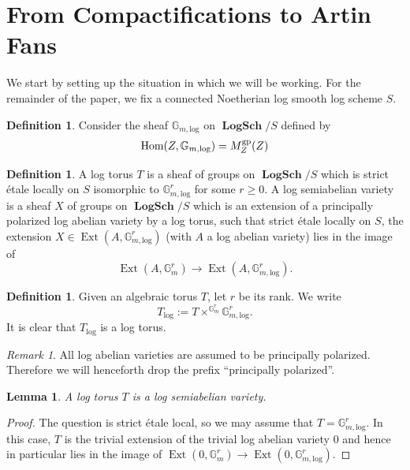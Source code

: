 \documentclass[11pt]{amsart}
\newtheorem{lemma}[theorem]{Lemma}
\theoremstyle{definition}
\newtheorem{definition}[theorem]{Definition}
\theoremstyle{remark}
\newtheorem{remark}[theorem]{Remark}
\DeclareMathOperator{\Ext}{Ext}
\def\log{\mathrm{log}}
\def\gp{\mathrm{gp}}
\DeclareMathOperator{\LogSch}{\mathbf{LogSch}}
\DeclareMathOperator{\Hom}{\textup{Hom}}
\begin{document}
\section{From Compactifications to Artin Fans}
\label{sec:first_results}

We start by setting up the situation in which we will be working. For the remainder of the paper, we fix a connected Noetherian log smooth log scheme $S$.

\begin{definition}
    Consider the sheaf $\mathbb{G}_{m,\log}$ on $\LogSch/S$ defined by
    \begin{align*}
		\Hom(Z,\mathbb{G}_{m,\log}) = M_Z^{\gp}(Z)
    \end{align*}
\end{definition}

\begin{definition}
	A log torus $T$ is a sheaf of groups on $\LogSch/S$ which is strict étale locally on $S$ isomorphic to
	$\mathbb{G}_{m,\log}^{r}$ for some $r\ge 0$.
	A log semiabelian variety is a sheaf $X$ of groups on $\LogSch/S$ which is an extension of a principally polarized log abelian
	variety by a log torus, such that strict étale locally on $S$, the extension $X\in \Ext(A,\mathbb{G}_{m,\log}^{r})$
	(with $A$ a log abelian variety) lies in the image of
	$$\Ext(A,\mathbb{G}_m^{r})\to \Ext(A,\mathbb{G}_{m,\log}^{r}).$$
\end{definition}

\begin{definition}
	Given an algebraic torus $T$, let $r$ be its rank. We write
	$$T_{\log}:=T\times^{\mathbb{G}_m^r}\mathbb{G}_{m,\log}^r.$$
	It is clear that $T_{\log}$ is a log torus.
\end{definition}

\begin{remark}
	All log abelian varieties are assumed to be principally
	polarized. Therefore we will henceforth drop the prefix
	``principally polarized''.
\end{remark}

\begin{lemma}
	A log torus $T$ is a log semiabelian variety.
\end{lemma}

\begin{proof}
	The question is strict étale local, so we may assume that $T=\mathbb{G}_{m,\log}^{r}$. In this case,
	$T$ is the trivial extension of the trivial log abelian variety $0$ and hence in particular lies in
	the image of $\Ext(0,\mathbb{G}_{m}^{r})\to \Ext(0,\mathbb{G}_{m,\log}^{r})$.
\end{proof}
\end{document}
